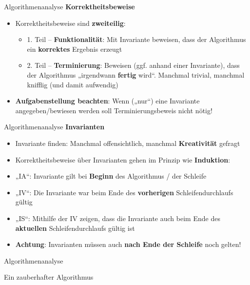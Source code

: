 \begin{frame}{Algorithmenanalyse}
	\textbf{Korrektheitsbeweise} \\
	\pause
	\begin{itemize}
		\item Korrektheitsbeweise sind \textbf{zweiteilig}:
		\pause
		\begin{itemize}
			\item 1. Teil -- \textbf{Funktionalität}: Mit Invariante beweisen, dass der Algorithmus ein \textbf{korrektes} Ergebnis erzeugt
			\pause
			\item 2. Teil -- \textbf{Terminierung}: Beweisen (ggf. anhand einer Invariante), dass der Algorithmus „irgendwann \textbf{fertig} wird“. Manchmal trivial, manchmal knifflig (und damit aufwendig)
		\end{itemize}
		\pause
		\item \textbf{Aufgabenstellung beachten}: Wenn („nur“) eine Invariante angegeben/bewiesen werden soll \impl Terminierungsbeweis nicht nötig!
	\end{itemize}
\end{frame}

\begin{frame}{Algorithmenanalyse}
	\textbf{Invarianten} \\
	\pause
	\begin{itemize}
		\item Invariante finden: Manchmal offensichtlich, manchmal \textbf{Kreativität} gefragt
		\pause
		\item Korrektheitsbeweise über Invarianten gehen im Prinzip wie \textbf{Induktion}:
		\pause
		\item „IA“: Invariante gilt bei \textbf{Beginn} des Algorithmus / der Schleife
		\pause
		\item „IV“: Die Invariante war beim Ende des \textbf{vorherigen} Schleifendurchlaufs gültig
		\pause
		\item „IS“: Mithilfe der IV zeigen, dass die Invariante auch beim Ende des \textbf{aktuellen} Schleifendurchlaufs gültig ist
		\item \textbf{Achtung}: Invarianten müssen auch \textbf{nach Ende der Schleife} noch gelten!
	\end{itemize}
\end{frame}

\iffalse  %

\begin{frame}{Algorithmenanalyse}
	\begin{exampleblock}{Ein zauberhafter Algorithmus}
		\begin{algorithm}[H]
			\DontPrintSemicolon
			\footnotesize
		\end{algorithm}
	\end{exampleblock}
\end{frame}


